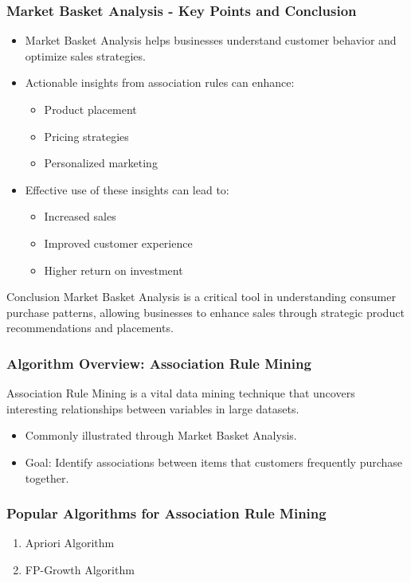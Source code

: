 \documentclass{beamer}
\begin{document}
\begin{frame}[fragile]
    \frametitle{Market Basket Analysis - Key Points and Conclusion}
    \begin{itemize}
        \item Market Basket Analysis helps businesses understand customer behavior and optimize sales strategies.
        \item Actionable insights from association rules can enhance:
        \begin{itemize}
            \item Product placement
            \item Pricing strategies
            \item Personalized marketing
        \end{itemize}
        \item Effective use of these insights can lead to:
        \begin{itemize}
            \item Increased sales
            \item Improved customer experience
            \item Higher return on investment
        \end{itemize}
    \end{itemize}

    \begin{block}{Conclusion}
        Market Basket Analysis is a critical tool in understanding consumer purchase patterns, allowing businesses to enhance sales through strategic product recommendations and placements.
    \end{block}
\end{frame}

\begin{frame}[fragile]
    \frametitle{Algorithm Overview: Association Rule Mining}
    Association Rule Mining is a vital data mining technique that uncovers interesting relationships between variables in large datasets. 
    \begin{itemize}
        \item Commonly illustrated through Market Basket Analysis.
        \item Goal: Identify associations between items that customers frequently purchase together.
    \end{itemize}
\end{frame}

\begin{frame}[fragile]
    \frametitle{Popular Algorithms for Association Rule Mining}
    \begin{enumerate}
        \item Apriori Algorithm
        \item FP-Growth Algorithm
    \end{enumerate}
\end{frame}
\end{document}
